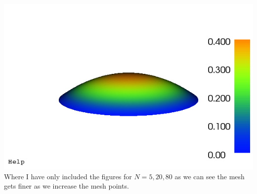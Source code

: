 \documentclass{article}
\begin{document}
\begin{enumerate}
\includegraphics[scale=0.3]{dolfin_plot_5.png}\\
Where I have only included the figures for $N=5,20,80$ as we can see the mesh gets finer as we increase the mesh points.\\


\end{enumerate}
\end{document}
